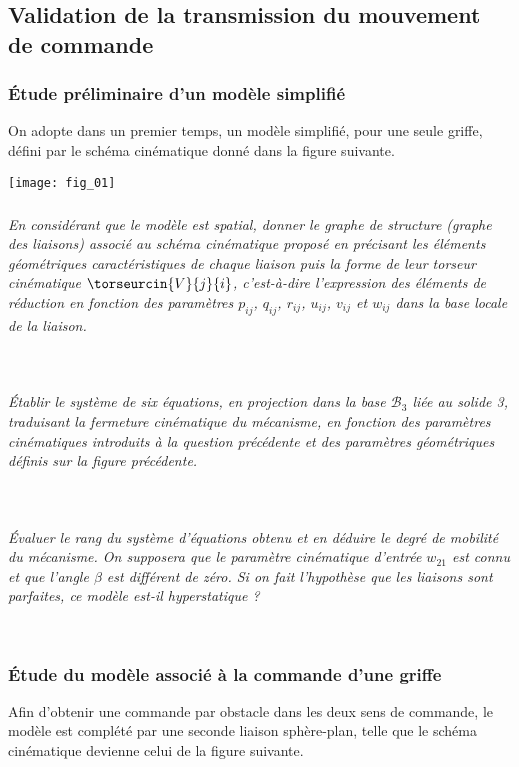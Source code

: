 \begin{multicols}{2}
\subsection*{Validation de la transmission du mouvement de commande} 
\subsubsection*{Étude préliminaire d'un modèle simplifié}
On adopte dans un premier temps, un modèle simplifié, pour une seule griffe, défini par le schéma cinématique
donné dans la figure suivante.


\begin{center}
\texttt{[image: fig\_01]}
\end{center}


\subparagraph{}\textit{En considérant que le modèle est spatial, donner le graphe de structure (graphe des liaisons) associé au schéma cinématique proposé en précisant les éléments géométriques caractéristiques de chaque liaison puis
la forme de leur torseur cinématique $\torseurcin{V}{j}{i}$, c'est-à-dire l'expression des éléments de réduction en fonction des paramètres $p_{ij}$, $q_{ij}$, $r_{ij}$, $u_{ij}$, $v_{ij}$ et $w_{ij}$ dans la base locale de la liaison.}
\ifprof
\begin{corrige}~\\
\end{corrige}
\else
\fi

\subparagraph{}\textit{Établir le système de six équations, en projection dans la base $\mathcal{B}_{3}$ liée au solide 3, traduisant la fermeture cinématique du mécanisme, en fonction des paramètres cinématiques introduits à la question précédente et des paramètres géométriques définis sur la figure précédente.}
\ifprof
\begin{corrige}~\\
\end{corrige}
\else
\fi


\subparagraph{}\textit{Évaluer le rang du système d'équations obtenu et en déduire le degré de mobilité du mécanisme. On supposera
que le paramètre cinématique d'entrée $w_{21}$ est connu et que l'angle $\beta$ est différent de zéro.
Si on fait l'hypothèse que les liaisons sont parfaites, ce modèle est-il hyperstatique ?}
\ifprof
\begin{corrige}~\\
\end{corrige}
\else
\fi

\subsubsection*{Étude du modèle associé à la commande d'une griffe}
Afin d'obtenir une commande par obstacle dans les deux sens de commande, le modèle est complété par une
seconde liaison sphère-plan, telle que le schéma cinématique devienne celui de la figure suivante.


\end{multicols}
